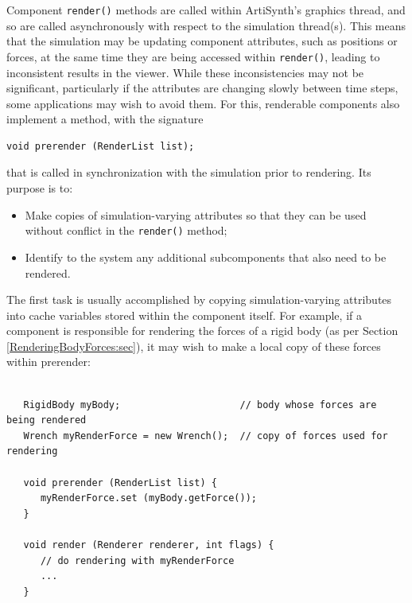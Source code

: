Component {\tt render()} methods are called within ArtiSynth's
graphics thread, and so are called asynchronously with respect to the
simulation thread(s). This means that the simulation may be updating
component attributes, such as positions or forces, at the same time
they are being accessed within {\tt render()}, leading to inconsistent
results in the viewer. While these inconsistencies may not be
significant, particularly if the attributes are changing slowly
between time steps, some applications may wish to avoid them.  For
this, renderable components also implement a
method, with the signature
%
\begin{lstlisting}[]
  void prerender (RenderList list);
\end{lstlisting}
%
that is called in synchronization with the simulation prior to
rendering. Its purpose is to:

\begin{itemize}

\item Make copies of simulation-varying attributes so that
they can be used without conflict in the {\tt render()} method;

\item Identify to the system any additional subcomponents that also need
to be rendered.

\end{itemize}

The first task is usually accomplished by copying simulation-varying
attributes into cache variables stored within the component itself.
For example, if a component is responsible for rendering the forces of
a rigid body (as per Section \ref{RenderingBodyForces:sec}), it may
wish to make a local copy of these forces within prerender:
%
\begin{lstlisting}[]
   
   RigidBody myBody;                     // body whose forces are being rendered
   Wrench myRenderForce = new Wrench();  // copy of forces used for rendering

   void prerender (RenderList list) {
      myRenderForce.set (myBody.getForce());
   }

   void render (Renderer renderer, int flags) {
      // do rendering with myRenderForce
      ...
   }
\end{lstlisting}
%

